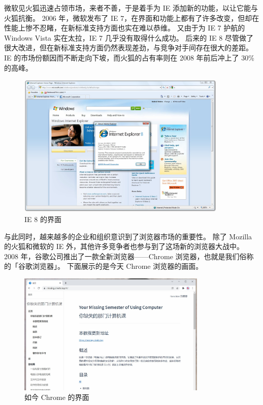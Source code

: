 微软见火狐迅速占领市场，来者不善，于是着手为 IE 添加新的功能，以让它能与火狐抗衡。
2006 年，微软发布了 IE 7，在界面和功能上都有了许多改变，但却在性能上惨不忍睹，在新标准支持方面也实在难以恭维。
又由于为 IE 7 护航的 Windows Vista 实在太拉，IE 7 几乎没有取得什么成功。
后来的 IE 8 尽管做了很大改进，但在新标准支持方面仍然表现差劲，与竞争对手间存在很大的差距。
IE 的市场份额因而不断走向下坡，而火狐的占有率则在 2008 年前后冲上了 30\% 的高峰。

\begin{figure}[htb!]
  \centering
  \includegraphics[width=10cm]{assets/IE_8.jpg}
  \caption{IE 8 的界面}
  \label{IE_8}
\end{figure}

与此同时，越来越多的企业和组织意识到了浏览器市场的重要性。
除了 Mozilla 的火狐和微软的 IE 外，其他许多竞争者也参与到了这场新的浏览器大战中。
2008 年，谷歌公司推出了一款全新浏览器——Chrome 浏览器，也就是我们俗称的「谷歌浏览器」。
下面展示的是今天 Chrome 浏览器的画面。

\begin{figure}[htb!]
  \centering
  \includegraphics[width=9cm]{assets/Chrome_Example.jpg}
  \caption{如今 Chrome 的界面}
  \label{Chrome_Example}
\end{figure}

